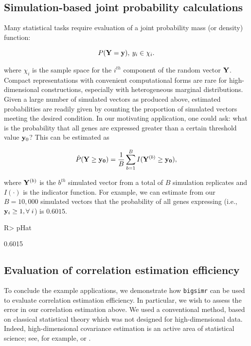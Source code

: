 \documentclass[
]{jss}
\begin{document}
\hypertarget{simulation-based-joint-probability-calculations}{%
\subsection{Simulation-based joint probability
calculations}\label{simulation-based-joint-probability-calculations}}

Many statistical tasks require evaluation of a joint probability mass
(or density) function:

\[
P( {\bf Y} = {\bf y} ), \: y_i \in \chi_i.
\]

where \(\chi_i\) is the sample space for the \(i^{th}\) component of the
random vector \(\bf{Y}\). Compact representations with convenient
computational forms are rare for high-dimensional constructions,
especially with heterogeneous marginal distributions. Given a large
number of simulated vectors as produced above, estimated probabilities
are readily given by counting the proportion of simulated vectors
meeting the desired condition. In our motivating application, one could
ask: what is the probability that all genes are expressed greater than a
certain threshold value \({\bf y}_0\)? This can be estimated as

\[
\hat{P}( {\bf Y} \ge {\bf y_0 } ) = \frac{1}{B} \sum_{b=1}^B I( {\bf Y}^{ (b) } \ge {\bf y_0} ),
\]

where \({\bf Y}^{(b)}\) is the \(b^{th}\) simulated vector from a total
of \(B\) simulation replicates and \(I(\cdot)\) is the indicator
function. For example, we can estimate from our \(B=10,000\) simulated
vectors that the probability of all genes expressing (i.e.,
\({\bf y}_i \geq 1, \forall \; i\)) is \(0.6015\).

\begin{CodeChunk}
\begin{CodeInput}
R> pHat
\end{CodeInput}
\begin{CodeOutput}
[1] 0.6015
\end{CodeOutput}
\end{CodeChunk}

\hypertarget{evaluation-of-correlation-estimation-efficiency}{%
\subsection{Evaluation of correlation estimation
efficiency}\label{evaluation-of-correlation-estimation-efficiency}}

To conclude the example applications, we demonstrate how
\texttt{bigsimr} can be used to evaluate correlation estimation
efficiency. In particular, we wish to assess the error in our
correlation estimation above. We used a conventional method, based on
classical statistical theory which was not designed for high-dimensional
data. Indeed, high-dimensional covariance estimation is an active area
of statistical science; see, for example, \citet{Won2013g} or
\citet{VanWieringen2016}.
\end{document}
